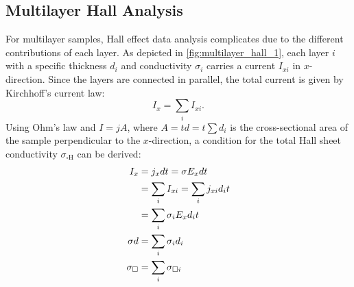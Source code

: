 \subsection{ Multilayer Hall Analysis}
For multilayer samples, Hall effect data analysis complicates due to the different
contributions of each layer.
As depicted in \cref{fig:multilayer_hall_1}, each layer $i$ with a specific thickness 
$d_i$ and conductivity $\sigma_i$ carries a current $I_{xi}$ in $x$-direction.
Since the layers are connected in parallel, the total current is 
given by Kirchhoff's current law:
\begin{equation}
	I_x = \sum_i I_{xi}.
\end{equation}
Using Ohm's law and $I=jA$, where $A=t d = t \sum d_i$ is the cross-sectional area of 
the sample perpendicular to the $x$-direction, a condition for the total Hall sheet 
conductivity $\sigma_\mathrm{\square H}$ can be derived:
\begin{align}
	I_{x}&=j_{x}dt=\sigma E_{x} dt \notag\\
	&=\sum_{i}I_{x i}=\sum_{i}j_{x i} d_{i}t \notag\\
	&=\sum_{i}\sigma_{i} E_{x}d_{i}t  \\
	\sigma d&=\sum_{i}\sigma_{i}d_{i} \\
	\sigma_{\mathrm{\square}}&=\sum_{i} \sigma_{\square i}
	\label{eq:multilayer_sum_1}
\end{align}

